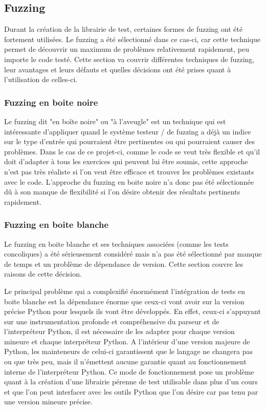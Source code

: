 \documentclass[a4paper]{report}
\begin{document}
\subsection{Fuzzing}

Durant la création de la librairie de test, certaines formes de fuzzing ont été fortement utilisées.
Le fuzzing a été sélectionné dans ce cas-ci, car cette technique permet de découvrir un maximum de problèmes relativement rapidement, peu importe le code testé.
Cette section va couvrir différentes techniques de fuzzing, leur avantages et leurs défauts et quelles décisions ont été prises quant à l'utilisation de celles-ci.


\subsubsection{Fuzzing en boite noire}

Le fuzzing dit "en boîte noire" ou "à l'aveugle" est un technique qui est intéressante d'appliquer quand le système testeur / de fuzzing a déjà un indice sur le type d'entrée qui pourraient être pertinentes ou qui pourraient causer des problèmes.
Dans le cas de ce projet-ci, comme le code se veut très flexible et qu'il doit d'adapter à tous les exercices qui peuvent lui être soumis, cette approche n'est pas très réaliste si l'on veut être efficace et trouver les problèmes existants avec le code.
L'approche du fuzzing en boite noire n'a donc pas été sélectionnée dû à son manque de flexibilité si l'on désire obtenir des résultats pertinents rapidement.

\subsubsection{Fuzzing en boite blanche}

Le fuzzing en boite blanche et ses techniques associées (comme les tests concoliques) a été sérieusement considéré mais n'a pas été sélectionné par manque de temps et un problème de dépendance de version.
Cette section couvre les raisons de cette décision.


Le principal problème qui a complexifié énormément l'intégration de tests en boite blanche est la dépendance énorme que ceux-ci vont avoir sur la version précise Python pour lesquels ils vont être développés.
En effet, ceux-ci s'appuyant sur une instrumentation profonde et compréhensive du parseur et de l'interpréteur Python, il est nécessaire de les adapter pour chaque version mineure et chaque interpréteur Python.
A l'intérieur d'une version majeure de Python, les mainteneurs de celui-ci garantissent que le langage ne changera pas ou que très peu, mais il n'émettent aucune garantie quant au fonctionnement interne de l'interpréteur Python.
Ce mode de fonctionnement pose un problème quant à la création d'une librairie pérenne de test utilisable dans plus d'un cours et que l'on peut interfacer avec les outils Python que l'on désire car pas tenu par une version mineure précise.
\end{document}
